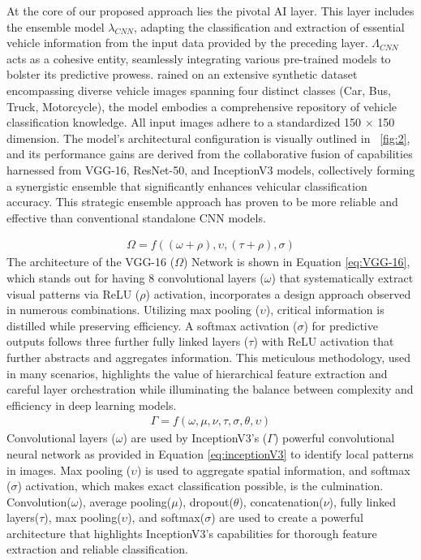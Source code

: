 \documentclass[10pt, conference, a4paper, compsocconf]{IEEEtran}
\begin{document}
At the core of our proposed approach lies the pivotal AI layer. This layer includes the ensemble model $\lambda_{CNN}$, adapting the classification and extraction of essential vehicle information from the input data provided by the preceding layer. $\Lambda_{CNN}$ acts as a cohesive entity, seamlessly integrating various pre-trained models to bolster its predictive prowess. rained on an extensive synthetic dataset \cite{one} \cite{two} \cite{three} \cite{four} \cite{five} encompassing diverse vehicle images spanning four distinct classes (Car, Bus, Truck, Motorcycle), the model embodies a comprehensive repository of vehicle classification knowledge. All input images adhere to a standardized 150 $\times$ 150 dimension. The model's architectural configuration is visually outlined in \figurename \ \ref{fig:2}, and its performance gains are derived from the collaborative fusion of capabilities harnessed from VGG-16, ResNet-50, and InceptionV3 models, collectively forming a synergistic ensemble that significantly enhances vehicular classification accuracy. This strategic ensemble approach has proven to be more reliable and effective than conventional standalone CNN models.


\begin{equation}\label{eq:VGG-16}
    \begin{aligned}
        \Omega = f ((\omega+\rho),\upsilon,(\tau+\rho),\sigma)
    \end{aligned}
\end{equation}
\indent The architecture of the VGG-16 ($\Omega$) Network is shown in Equation \ref{eq:VGG-16}, which stands out for having 8 convolutional layers ($\omega$) that systematically extract visual patterns via ReLU ($\rho$) activation, incorporates a design approach observed in numerous combinations. Utilizing max pooling ($\upsilon$), critical information is distilled while preserving efficiency. A softmax activation ($\sigma$) for predictive outputs follows three further fully linked layers ($\tau$) with ReLU activation that further abstracts and aggregates information. This meticulous methodology, used in many scenarios, highlights the value of hierarchical feature extraction and careful layer orchestration while illuminating the balance between complexity and efficiency in deep learning models.
\begin{equation}\label{eq:inceptionV3}
    \begin{aligned}
        \Gamma = f (\omega,\mu,\nu,\tau,\sigma,\theta,\upsilon)
    \end{aligned}
\end{equation}
\indent Convolutional layers ($\omega$) are used by InceptionV3's ($\Gamma$) powerful convolutional neural network as provided in Equation \ref{eq:inceptionV3} to identify local patterns in images. Max pooling ($\upsilon$) is used to aggregate spatial information, and softmax ($\sigma$) activation, which makes exact classification possible, is the culmination. Convolution($\omega$), average pooling($\mu$), dropout($\theta$), concatenation($\nu$), fully linked layers($\tau$), max pooling($\upsilon$), and softmax($\sigma$) are used to create a powerful architecture that highlights InceptionV3's capabilities for thorough feature extraction and reliable classification.
\end{document}
